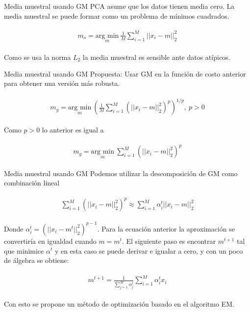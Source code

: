 \documentclass{beamer}
\begin{document}
\begin{frame}{Media muestral usando GM}
	PCA asume que los datos tienen media cero. La media muestral se puede formar como un problema de mínimos cuadrados.
	
	\begin{align}
	\label{eqn:eqlabel}
	\begin{split}
		m_s = \underset{m}{\text{arg min}}\ \frac{1}{M} \sum_{i = 1}^M ||x_i - m||_2^2
	\end{split}
	\end{align}
	
	Como se usa la norma $L_2$ la media muestral es sensible ante datos atípicos.
\end{frame}

\begin{frame}{Media muestral usando GM}
	Propuesta: Usar GM en la función de costo anterior para obtener una versión más robusta.
	
	\begin{align}
	\label{eqn:eqlabel}
	\begin{split}
		m_g = \underset{m}{\text{arg min}}\ (\frac{1}{M} \sum_{i = 1}^M (||x_i - m||_2^2)^p)^{1/p},\ p > 0
	\end{split}
	\end{align}
	
	Como $p > 0$ lo anterior es igual a
	
	\begin{align}
	\label{eqn:eqlabel}
	\begin{split}
		m_g = \underset{m}{\text{arg min}}\ \sum_{i = 1}^M (||x_i - m||_2^2)^p
	\end{split}
	\end{align}
\end{frame}

\begin{frame}{Media muestral usando GM}
	Podemos utilizar la descomposición de GM como combinación lineal
	
	\begin{align}
	\label{eqn:eqlabel}
	\begin{split}
	\sum_{i = 1}^M (||x_i - m||_2^2)^p \approx \sum_{i = 1}^M \alpha_i^t ||x_i - m||_2^2
	\end{split}
	\end{align}
	
	Donde $\alpha_i^t = (||x_i - m^t||_2^2)^{p - 1}$. Para la ecuación anterior la aproximación se convertiría en igualdad cuando $m = m^t$. El siguiente paso es encontrar $m^{t + 1}$ tal que minimice $\alpha^t$ y en esta caso se puede derivar e igualar a cero, y con un poco de álgebra se obtiene:
	
	\begin{align}
	\label{eqn:eqlabel}
	\begin{split}
		m^{t + 1} = \frac{1}{\sum_{j = 1}^M \alpha_j^t} \sum_{i = 1}^M \alpha_i^t x_i
	\end{split}
	\end{align}
	
	Con esto se propone un método de optimización basado en el algoritmo EM.
\end{frame}
\end{document}
